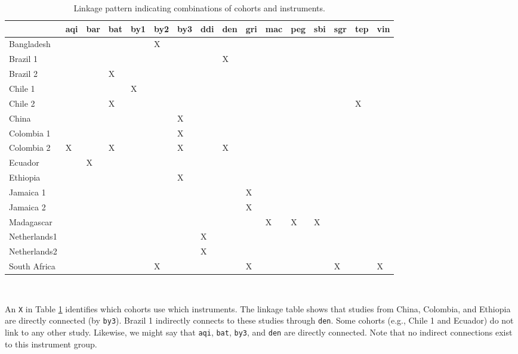 \documentclass[
]{book}
\begin{document}
\begin{table}

\caption{\label{tab:linkage}Linkage pattern indicating combinations of cohorts and instruments.}
\centering
\begin{tabular}[t]{llllllllllllllll}
\toprule
  & aqi & bar & bat & by1 & by2 & by3 & ddi & den & gri & mac & peg & sbi & sgr & tep & vin\\
\midrule
Bangladesh &  &  &  &  & X &  &  &  &  &  &  &  &  &  & \\
Brazil 1 &  &  &  &  &  &  &  & X &  &  &  &  &  &  & \\
Brazil 2 &  &  & X &  &  &  &  &  &  &  &  &  &  &  & \\
Chile 1 &  &  &  & X &  &  &  &  &  &  &  &  &  &  & \\
Chile 2 &  &  & X &  &  &  &  &  &  &  &  &  &  & X & \\
\addlinespace
China &  &  &  &  &  & X &  &  &  &  &  &  &  &  & \\
Colombia 1 &  &  &  &  &  & X &  &  &  &  &  &  &  &  & \\
Colombia 2 & X &  & X &  &  & X &  & X &  &  &  &  &  &  & \\
Ecuador &  & X &  &  &  &  &  &  &  &  &  &  &  &  & \\
Ethiopia &  &  &  &  &  & X &  &  &  &  &  &  &  &  & \\
\addlinespace
Jamaica 1 &  &  &  &  &  &  &  &  & X &  &  &  &  &  & \\
Jamaica 2 &  &  &  &  &  &  &  &  & X &  &  &  &  &  & \\
Madagascar &  &  &  &  &  &  &  &  &  & X & X & X &  &  & \\
Netherlands1 &  &  &  &  &  &  & X &  &  &  &  &  &  &  & \\
Netherlands2 &  &  &  &  &  &  & X &  &  &  &  &  &  &  & \\
\addlinespace
South Africa &  &  &  &  & X &  &  &  & X &  &  &  & X &  & X\\
\bottomrule
\end{tabular}
\end{table}

~

An \texttt{X} in Table \ref{tab:linkage} identifies which cohorts use which instruments. The linkage table shows that studies from China, Colombia, and Ethiopia are directly connected (by \texttt{by3}). Brazil 1 indirectly connects to these studies through \texttt{den}. Some cohorts (e.g., Chile 1 and Ecuador) do not link to any other study. Likewise, we might say that \texttt{aqi}, \texttt{bat}, \texttt{by3}, and \texttt{den} are directly connected. Note that no indirect connections exist to this instrument group.
\end{document}

